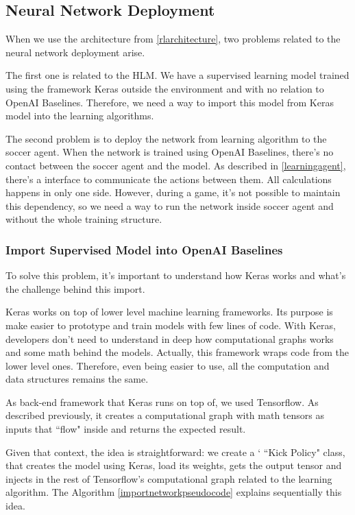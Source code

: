 \subsection{Neural Network Deployment}

When we use the architecture from \ref{rlarchitecture}, two problems related to the neural network deployment arise.

The first one is related to the HLM. We have a supervised learning model trained using the framework Keras outside the environment and with no relation to OpenAI Baselines. Therefore, we need a way to import this model from Keras model into the learning algorithms.

The second problem is to deploy the network from learning algorithm to the soccer agent. When the network is trained using OpenAI Baselines, there's no contact between the soccer agent and the model. As described in \ref{learningagent}, there's a interface to communicate the actions between them. All calculations happens in only one side. However, during a game, it's not possible to maintain this dependency, so we need a way to run the network inside soccer agent and without the whole training structure.

\subsubsection{Import Supervised Model into OpenAI Baselines}

To solve this problem, it's important to understand how Keras works and what's the challenge behind this import. 

Keras works on top of lower level machine learning frameworks. Its purpose is make easier to prototype and train models with few lines of code. With Keras, developers don't need to understand in deep how computational graphs works and some math behind the models. Actually, this framework wraps code from the lower level ones. Therefore, even being easier to use, all the computation and data structures remains the same.

As back-end framework that Keras runs on top of, we used Tensorflow. As described previously, it creates a computational graph with math tensors as inputs that ``flow" inside and returns the expected result.

Given that context, the idea is straightforward: we create a `    ``Kick Policy" class, that creates the model using Keras, load its weights, gets the output tensor and injects in the rest of Tensorflow's computational graph related to the learning algorithm. The Algorithm \ref{importnetworkpseudocode} explains sequentially this idea.

